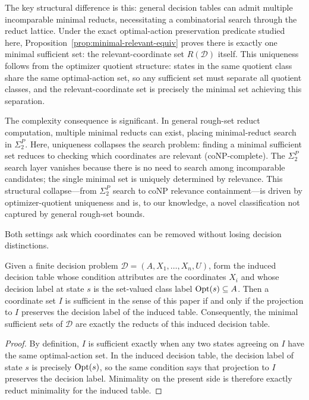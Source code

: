The key structural difference is this: general decision tables can admit multiple incomparable minimal reducts, necessitating a combinatorial search through the reduct lattice. Under the exact optimal-action preservation predicate studied here, Proposition~\ref{prop:minimal-relevant-equiv} proves there is exactly one minimal sufficient set: the relevant-coordinate set $R(\mathcal{D})$ itself. This uniqueness follows from the optimizer quotient structure: states in the same quotient class share the same optimal-action set, so any sufficient set must separate all quotient classes, and the relevant-coordinate set is precisely the minimal set achieving this separation.

The complexity consequence is significant. In general rough-set reduct computation, multiple minimal reducts can exist, placing minimal-reduct search in $\Sigma_2^P$. Here, uniqueness collapses the search problem: finding a minimal sufficient set reduces to checking which coordinates are relevant (coNP-complete). The $\Sigma_2^P$ search layer vanishes because there is no need to search among incomparable candidates; the single minimal set is uniquely determined by relevance. This structural collapse—from $\Sigma_2^P$ search to coNP relevance containment—is driven by optimizer-quotient uniqueness and is, to our knowledge, a novel classification not captured by general rough-set bounds.

Both settings ask which coordinates can be removed without losing decision distinctions.

\begin{proposition}\label{prop:static-rough-set-bridge}
Given a finite decision problem $\mathcal{D}=(A,X_1,\ldots,X_n,U)$, form the induced decision table whose condition attributes are the coordinates $X_i$ and whose decision label at state $s$ is the set-valued class label $\mathrm{Opt}(s) \subseteq A$. Then a coordinate set $I$ is sufficient in the sense of this paper if and only if the projection to $I$ preserves the decision label of the induced table. Consequently, the minimal sufficient sets of $\mathcal{D}$ are exactly the reducts of this induced decision table.
\end{proposition}


\begin{proof}
By definition, $I$ is sufficient exactly when any two states agreeing on $I$ have the same optimal-action set. In the induced decision table, the decision label of state $s$ is precisely $\mathrm{Opt}(s)$, so the same condition says that projection to $I$ preserves the decision label. Minimality on the present side is therefore exactly reduct minimality for the induced table.
\end{proof}

